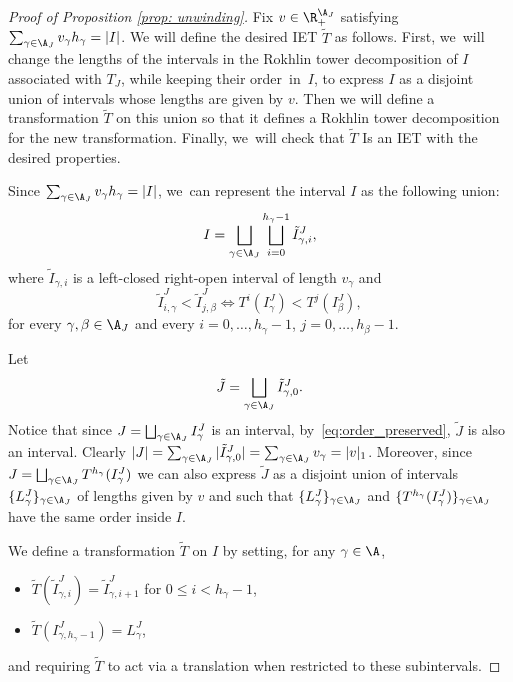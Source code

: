 \begin{proof}[Proof of Proposition \ref{prop: unwinding}]
Fix $v \in \R^{\A_J}_+$ satisfying $\sum_{\gamma \in \A_J} v_\gamma h_\gamma = |I|$. We will define the desired IET $\tilde T$ as follows. First, we~will change the lengths of the intervals in the Rokhlin tower decomposition of $I$ associated with $T_J$, while keeping their order~in~$I$, to express $I$ as a disjoint union of intervals whose lengths are given by $v$. Then we will define a transformation $\tilde T$ on this union so that it defines a Rokhlin tower decomposition for the new transformation. Finally, we~will check that $\tilde T$ Is an IET with the desired properties.

Since $\sum_{\gamma \in \A_J} v_\gamma h_\gamma = |I|$, we~can represent the interval $I$ as the following union:
\begin{equation}
\label{eq:modified_towers}
I = \bigsqcup_{\gamma \in \A_J} \bigsqcup_{i = 0}^{h_\gamma - 1} \tilde I_{\gamma, i}^J,
\end{equation}
where $\tilde I_{\gamma, i}$ is a left-closed right-open interval of length $v_\gamma$ and
\begin{equation}\label{eq:order_preserved}
\tilde I_{i, \gamma}^J < \tilde I_{j, \beta}^J \iff T^i(I_\gamma^J) < T^j(I_\beta^J),
\end{equation}
for every $\gamma,\beta\in \A_J$ and every $i=0,\ldots, h_\gamma -1$, $j=0,\ldots, h_{\beta}-1$.

Let
\[
\tilde J = \bigsqcup_{\gamma \in \A_J} \tilde I_{\gamma, 0}^J.
\]
Notice that since $J = \bigsqcup_{\gamma \in \A_J} I_{\gamma}^J$ is an interval, by~\eqref{eq:order_preserved}, $\tilde J$ is also an interval. Clearly $|J| = \sum_{\gamma \in \A_J} |\tilde I_{\gamma, 0}^J| = \sum_{\gamma \in \A_J} v_\gamma = |v|_1$. Moreover, since $J = \bigsqcup_{\gamma \in \A_J} T^{h_\gamma}(I_{\gamma}^J)$ we can also express $\tilde J$ as a disjoint union of intervals $\{L^J_{\gamma}\}_{\gamma \in \A_J}$ of lengths given by $v$ and such that $\{L^J_{\gamma}\}_{\gamma \in \A_J}$ and $\{T^{h_\gamma}(I_{\gamma}^J)\}_{\gamma \in \A_J}$ have the same order inside $I$.

We define a transformation $\tilde T$ on $I$ by setting, for any $\gamma \in \A$,
\begin{itemize}
\item $\tilde{T}(\tilde I^J_{\gamma,i})=\tilde I^J_{\gamma,i+1}$ for $0\le i<h_{\gamma}-1$, \item $\tilde T(I^J_{\gamma, h_\gamma - 1}) = L_\gamma^J$,
\end{itemize}
and requiring $\tilde T$ to act via a translation when restricted to these subintervals.


\end{proof}

